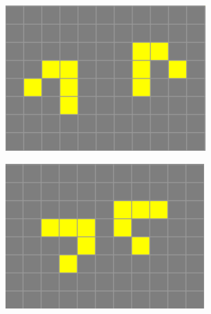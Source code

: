 \begin{figure}[h]
    \centering
    \begin{subfigure}{0.22\textwidth}
        \includegraphics[width=\textwidth]{images/life-glider-collission-1.png}
    \end{subfigure}
    \begin{subfigure}{0.22\textwidth}
        \includegraphics[width=\textwidth]{images/life-glider-collission-2.png}
    \end{subfigure}
    \begin{subfigure}{0.22\textwidth}

\end{subfigure}
\end{figure}
